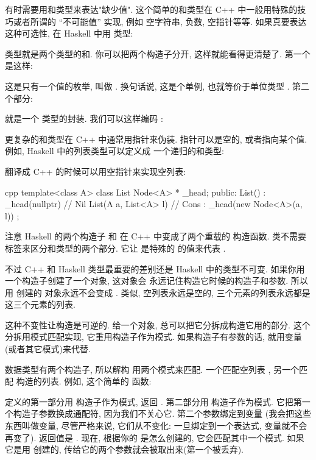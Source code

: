 有时需要用和类型来表达"缺少值". 这个简单的和类型在 C++ 中一般用特殊的技巧或者所谓的 ``不可能值'' 实现, 例如
空字符串, 负数, 空指针等等. 如果真要表达这种可选性, 在 Haskell 中用  类型:

 类型就是两个类型的和. 你可以把两个构造子分开, 这样就能看得更清楚了. 第一个是这样:

这是只有一个值的枚举, 叫做 . 换句话说, 这是个单例, 也就等价于单位类型 \code{()}.
第二个部分:

就是一个  类型的封装. 我们可以这样编码 :

更复杂的和类型在 C++ 中通常用指针来伪装. 指针可以是空的, 或者指向某个值. 例如, Haskell 中的列表类型可以定义成
一个递归的和类型:

翻译成 C++ 的时候可以用空指针来实现空列表:

\begin{snip}{cpp}
template<class A>
class List {
    Node<A> * _head;
public:
    List() : _head(nullptr) {} // Nil
    List(A a, List<A> l)       // Cons
      : _head(new Node<A>(a, l))
    {}
};
\end{snip}
注意 Haskell 的两个构造子  和  在 C++ 中变成了两个重载的  构造函数.
 类不需要标签来区分和类型的两个部分. 它让  是特殊的  的值来代表
.

不过 C++ 和 Haskell 类型最重要的差别还是 Haskell 中的类型不可变. 如果你用一个构造子创建了一个对象, 这对象会
永远记住构造它时候的构造子和参数. 所以用  创建的  对象永远不会变成 .
类似, 空列表永远是空的, 三个元素的列表永远都是这三个元素的列表.

这种不变性让构造是可逆的. 给一个对象, 总可以把它分拆成构造它用的部分. 这个分拆用模式匹配实现, 它重用构造子作为模式.
如果构造子有参数的话, 就用变量(或者其它模式)来代替.

 数据类型有两个构造子, 所以解构  用两个模式来匹配. 一个匹配空列表 , 另一个匹配
 构造的列表. 例如, 这个简单的  函数:

 定义的第一部分用  构造子作为模式, 返回 . 第二部分用  构造子作为模式.
它把第一个构造子参数换成通配符, 因为我们不关心它. 第二个参数绑定到变量  (我会把这些东西叫做变量, 尽管严格来说,
它们从不变化: 一旦绑定到一个表达式, 变量就不会再变了). 返回值是 . 现在, 根据你的  是怎么创建的,
它会匹配其中一个模式. 如果它是用  创建的, 传给它的两个参数就会被取出来(第一个被丢弃).

